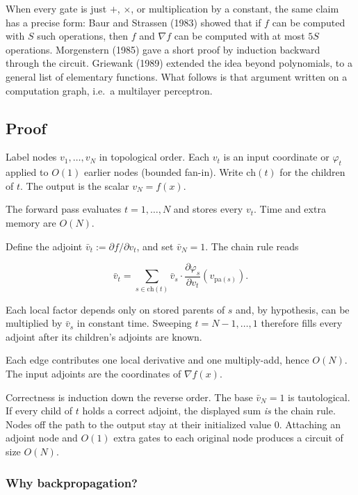 \documentclass[
]{book}
\begin{document}
When every gate is just \(+\), \(\times\), or multiplication by a constant, the same claim has a precise form: Baur and Strassen (1983) showed that if \(f\) can be computed with \(S\) such operations, then \(f\) and \(\nabla f\) can be computed with at most \(5S\) operations. Morgenstern (1985) gave a short proof by induction backward through the circuit. Griewank (1989) extended the idea beyond polynomials, to a general list of elementary functions. What follows is that argument written on a computation graph, i.e.~a multilayer perceptron.

\subsection*{Proof}\label{proof-1}

Label nodes \(v_1,\ldots,v_N\) in topological order. Each \(v_t\) is an input coordinate or \(\varphi_t\) applied to \(O(1)\) earlier nodes (bounded fan-in). Write \(\mathrm{ch}(t)\) for the children of \(t\). The output is the scalar \(v_N=f(x)\).

The forward pass evaluates \(t=1,\ldots,N\) and stores every \(v_t\). Time and extra memory are \(O(N)\).

Define the adjoint \(\bar v_t:=\partial f/\partial v_t\), and set \(\bar v_N=1\). The chain rule reads

\[
\bar v_t
=\sum_{s\in\mathrm{ch}(t)}\bar v_s\cdot\frac{\partial\varphi_s}{\partial v_t}(v_{\mathrm{pa}(s)}).
\]

Each local factor depends only on stored parents of \(s\) and, by hypothesis, can be multiplied by \(\bar v_s\) in constant time. Sweeping \(t=N-1,\ldots,1\) therefore fills every adjoint after its children's adjoints are known.

Each edge contributes one local derivative and one multiply-add, hence \(O(N)\). The input adjoints are the coordinates of \(\nabla f(x)\).

Correctness is induction down the reverse order. The base \(\bar v_N=1\) is tautological. If every child of \(t\) holds a correct adjoint, the displayed sum \emph{is} the chain rule. Nodes off the path to the output stay at their initialized value \(0\). Attaching an adjoint node and \(O(1)\) extra gates to each original node produces a circuit of size \(O(N)\).

\subsubsection*{Why backpropagation?}\label{why-backpropagation}
\end{document}
